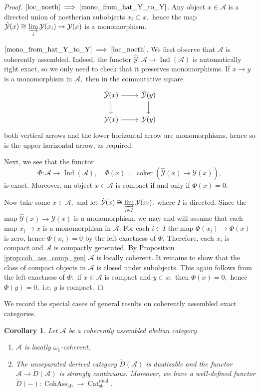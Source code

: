 \documentclass[11pt,leqno]{amsart}
\newcommand{\Implies}[2]{$\text{\ref{#1}}\implies\text{\ref{#2}}$}
\newtheorem{cor}[theo]{Corollary}
\numberwithin{equation}{section}
\newcommand{\indlim}[1][]{\mathop{\varinjlim}\limits_{#1}}
\newcommand{\Cat}{\operatorname{Cat}}
\newcommand{\st}{\operatorname{st}}
\newcommand{\dual}{\operatorname{dual}}
\newcommand{\cA}{{\mathcal A}}
\newcommand{\cY}{{\mathcal Y}}
\newcommand{\Cohass}{\operatorname{CohAss}}
\newcommand{\ab}{\operatorname{ab}}
\newcommand{\coker}{\operatorname{coker}}
\newcommand{\Ind}{\operatorname{Ind}}
\begin{document}
\begin{proof}
\Implies{loc_noeth}{mono_from_hat_Y_to_Y}. %
Any object $x\in\cA$ is a directed union of noetherian subobjects $x_i\subset x,$ hence the map $\hat{\cY}(x)\cong\indlim[i]\cY(x_i)\to\cY(x)$ is a monomorphism.

\Implies{mono_from_hat_Y_to_Y}{loc_noeth}. We first observe that $\cA$ is coherently assembled. Indeed, the functor $\hat{\cY}:\cA\to\Ind(\cA)$ is automatically right exact, so we only need to check that it preserves monomorphisms. If $x\to y$ is a monomorphism in $\cA,$ then in the commutative square
\begin{equation*}
\begin{tikzcd}
\hat{\cY}(x) \ar[r]\ar[d] & \hat{\cY}(y)\ar[d]\\
\cY(x)\ar[r] & \cY(y)
\end{tikzcd}
\end{equation*}
both vertical arrows and the lower horizontal arrow are monomorphisms, hence so is the upper horizontal arrow, as required.

Next, we see that the functor
\begin{equation*}
\Phi:\cA\to\Ind(\cA),\quad \Phi(x)=\coker(\hat{\cY}(x)\to\cY(x)),
\end{equation*}
is exact. Moreover, an object $x\in\cA$ is compact if and only if $\Phi(x)=0.$

Now take some $x\in\cA,$ and let $\hat{\cY}(x)\cong\indlim[i\in I]\cY(x_i),$ where $I$ is directed. Since the map $\hat{\cY}(x)\to\cY(x)$ is a monomorphism, we may and will assume that each map $x_i\to x$ is a monomorphism in $\cA.$ For each $i\in I$ the map $\Phi(x_i)\to\Phi(x)$ is zero, hence $\Phi(x_i)=0$ by the left exactness of $\Phi.$ Therefore, each $x_i$ is compact and $\cA$ is compactly generated. By Proposition \ref{prop:coh_ass_comp_gen} $\cA$ is locally coherent. It remains to show that the class of compact objects in $\cA$ is closed under subobjects. This again follows from the left exactness of $\Phi:$ if $x\in\cA$ is compact and $y\subset x,$ then $\Phi(x)=0,$ hence $\Phi(y)=0,$ i.e. $y$ is compact.
\end{proof}

We record the special cases of general results on coherently assembled exact categories.

\begin{cor}\label{cor:coh_ass_abelian_general}
Let $\cA$ be a coherently assembled abelian category.

\begin{enumerate}[label=(\roman*),ref=(\roman*)]
\item $\cA$ is locally $\omega_1$-coherent. \label{coh_ass_locally_omega_1_coherent}
\item The unseparated derived category $\check{D}(\cA)$ is dualizable and the functor $\cA\to\check{D}(\cA)$ is strongly continuous. Moreover, we have a well-defined functor $\check{D}(-):\Cohass_{\ab}\to\Cat_{\st}^{\dual}.$ \label{check_D_is_dualizable}
\end{enumerate} 
\end{cor}
\end{document}

